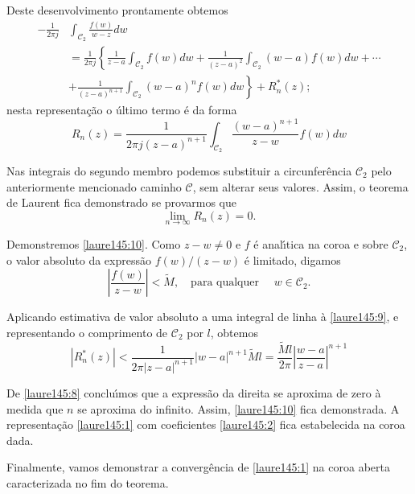 Deste desenvolvimento prontamente obtemos
\begin{align*}
- \frac{1}{2\pi j}&\int_{\mathcal{C}_2}\frac{f(w)}{w -
z}dw \\[2ex]
   &=\frac{1}{2\pi
   j}\left\{\frac{1}{z-a}\int_{\mathcal{C}_2}f(w)dw+\frac{1}{(z-a)^2}
   \int_{\mathcal{C}_2}(w
   -a)f(w)dw+\cdots\right.\\[2ex]
   &\left.+ \frac{1}{(z-a)^{n+1}}\int_{\mathcal{C}_2}(w -
a)^{n}f(w)dw\right\}+R^*_n(z);
\end{align*}
nesta representa\c{c}\~{a}o o \'{u}ltimo termo \'{e} da forma
\begin{equation}\label{laure145:9}
 R_n(z)= \frac{1}{2\pi j(z - a)^{n+1}}\int_{\mathcal{C}_2} \frac{(w -a)^{n+1}}{z-w}
 f(w)dw
\end{equation}

Nas integrais do segundo membro podemos substituir a
circunfer\^{e}ncia $\mathcal{C}_2$ pelo anteriormente mencionado
caminho $\mathcal{C}$, sem alterar seus valores. Assim, o teorema
de Laurent fica demonstrado se provarmos que
\begin{equation}\label{laure145:10}
 \lim_{n\to\infty} R_n(z) = 0.
\end{equation}

Demonstremos \eqref{laure145:10}. Como $z - w \neq 0$ e $f$ \'{e}
anal\'{\i}tica na coroa e sobre $\mathcal{C}_2$, o valor absoluto da
express\~{a}o $f(w)/(z - w)$ \'{e} limitado, digamos
\begin{equation*}
\left|\frac{f(w)}{z - w}\right| < \tilde{M},\quad \text{para
qualquer } \quad w \in \mathcal{C}_2.
\end{equation*}

Aplicando estimativa de valor absoluto a uma integral de linha \`{a}
\eqref{laure145:9}, e representando o comprimento de
$\mathcal{C}_2$ por $l$, obtemos
\begin{equation*}
|R_n^*(z)| < \frac{1}{2\pi|z-a|^{n+1}} |w - a|^{n+1}\tilde{M}l =
\frac{\tilde{M} l}{2\pi} \left|\frac{w - a}{z - a}\right|^{n+1}
\end{equation*}

De \eqref{laure145:8} conclu\'{\i}mos que a express\~{a}o da direita se
aproxima de zero \`{a} medida que $n$ se aproxima do infinito. Assim,
\eqref{laure145:10} fica demonstrada. A representa\c{c}\~{a}o
\eqref{laure145:1} com coeficientes \eqref{laure145:2} fica
estabelecida na coroa dada.

Finalmente, vamos demonstrar a converg\^{e}ncia de \eqref{laure145:1}
na coroa aberta caracterizada no fim do teorema.


